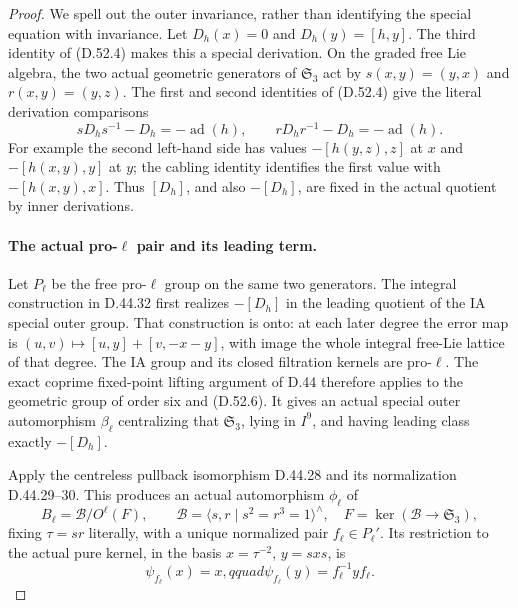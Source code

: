 \begin{proof}
We spell out the outer invariance, rather than identifying the
special equation with invariance. Let \(D_h(x)=0\) and
\(D_h(y)=[h,y]\). The third identity of \textup{(D.52.4)}
makes this a special derivation. On the graded free Lie algebra,
the two actual geometric generators of \(\mathfrak S_3\) act by
\(s(x,y)=(y,x)\) and \(r(x,y)=(y,z)\).
The first and second identities of \textup{(D.52.4)} give the
literal derivation comparisons
\[
 sD_hs^{-1}-D_h=-\operatorname{ad}(h),\qquad
 rD_hr^{-1}-D_h=-\operatorname{ad}(h).
 \tag{D.52.6}
\]
For example the second left-hand side has values
\(-[h(y,z),z]\) at \(x\) and \(-[h(x,y),y]\) at
\(y\); the cabling identity identifies the first value with
\(-[h(x,y),x]\). Thus \([D_h]\), and also \(-[D_h]\),
are fixed in the actual quotient by inner derivations.

\paragraph{The actual pro-\(\ell\) pair and its leading term.}
Let \(P_\ell\) be the free pro-\(\ell\) group on the same
two generators. The integral construction in D.44.32 first
realizes \(-[D_h]\) in the leading quotient of the IA special
outer group. That construction is onto: at each later degree
the error map is \((u,v)\mapsto[u,y]+[v,-x-y]\), with image
the whole integral free-Lie lattice of that degree. The IA group
and its closed filtration kernels are pro-\(\ell\).
The exact coprime fixed-point lifting argument of D.44 therefore
applies to the geometric group of order six and
\textup{(D.52.6)}. It gives an actual special outer automorphism
\(\beta_\ell\) centralizing that \(\mathfrak S_3\), lying
in \(I^9\), and having leading class exactly \(-[D_h]\).

Apply the centreless pullback isomorphism D.44.28 and its
normalization D.44.29--30. This produces an actual automorphism
\(\phi_\ell\) of
\[
 B_\ell=\mathcal B/O^\ell(F),\qquad
 \mathcal B=\langle s,r\mid s^2=r^3=1\rangle^{\wedge},
 \quad F=\ker(\mathcal B\to\mathfrak S_3),
 \tag{D.52.7}
\]
fixing \(\tau=sr\) literally, with a unique normalized pair
\(f_\ell\in P_\ell'\). Its restriction to the actual pure
kernel, in the basis \(x=\tau^{-2}\), \(y=sxs\), is
\[
              \psi_{f_\ell}(x)=x,qquad
              \psi_{f_\ell}(y)=f_\ell^{-1}yf_\ell.
 \tag{D.52.8}
\]


\end{proof}
